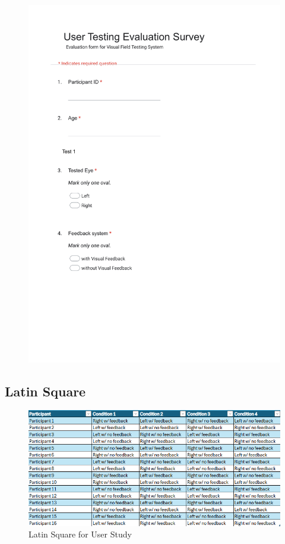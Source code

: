 \documentclass{l4proj}
\begin{document}
\begin{appendices}
\begin{figure}
    \includegraphics[page=11, width=1\linewidth]{images/User Testing Evaluation Form.pdf}
\end{figure}


\clearpage
\subsection{Latin Square}
\begin{figure}[!h]
    \centering
    \includegraphics[width=1\linewidth]{images/LatinSquare.png}
    \caption{Latin Square for User Study}
    \label{LatinSquare}
\end{figure}


\end{appendices}
\end{document}
